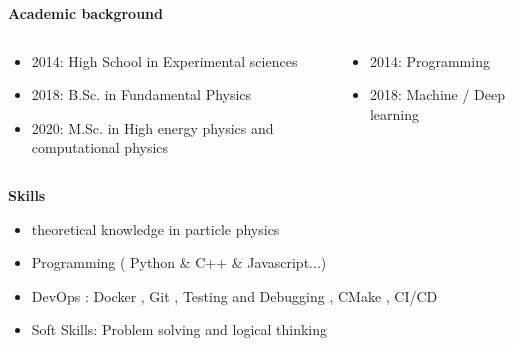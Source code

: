 \documentclass[11pt,aspectratio=169]{beamer}
\begin{document}
\begin{frame}{\underline{\secname}}

	\begin{center}
		\textbf{Academic background}
	\end{center}
	\begin{columns}
		\begin{column}{0.5\linewidth}

			\begin{itemize} 			  \setlength\itemsep{0em}

				\item 2014: High School in Experimental sciences
				\item 2018: B.Sc. in Fundamental Physics

				\item 2020: M.Sc. in High energy physics and computational physics
			\end{itemize}

		\end{column}

		\pause
		\begin{column}{0.5\linewidth}

			\begin{itemize}			  \setlength\itemsep{0em}

				\item 2014: Programming
				\item 2018: Machine / Deep learning
			\end{itemize}
		\end{column}
	\end{columns}
	\pause
	\begin{center}
		\textbf{Skills}
	\end{center}
	\begin{itemize}			  \setlength\itemsep{0em}
		\item
		      theoretical knowledge in particle physics

		\item
		      Programming ( Python \& C++ \& Javascript...)

		       \item  DevOps : Docker , Git , Testing and Debugging , CMake , CI/CD
		      
		\item Soft Skills: Problem solving and logical thinking %





\end{itemize}
\end{frame}
\end{document}
